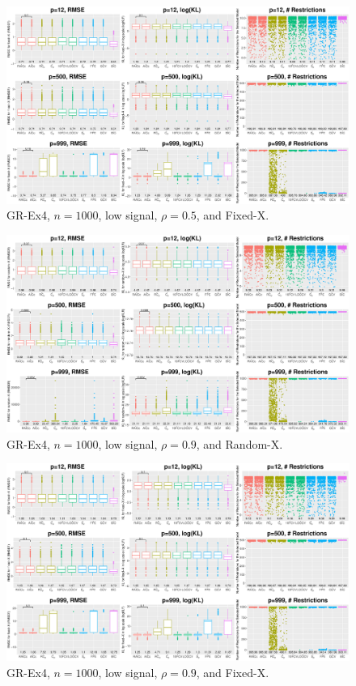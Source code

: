 \begin{figure}[!ht]
\centering
\includegraphics[width=\textwidth]{figures/supplement/fixedx_GR-Ex4_n1000_lsnr_rho05.eps}
\caption{GR-Ex4, $n=1000$, low signal, $\rho=0.5$, and Fixed-X.}
\end{figure}
\clearpage
\begin{figure}[!ht]
\centering
\includegraphics[width=\textwidth]{figures/supplement/randomx_GR-Ex4_n1000_lsnr_rho09.eps}
\caption{GR-Ex4, $n=1000$, low signal, $\rho=0.9$, and Random-X.}
\end{figure}
\begin{figure}[!ht]
\centering
\includegraphics[width=\textwidth]{figures/supplement/fixedx_GR-Ex4_n1000_lsnr_rho09.eps}
\caption{GR-Ex4, $n=1000$, low signal, $\rho=0.9$, and Fixed-X.}
\end{figure}
